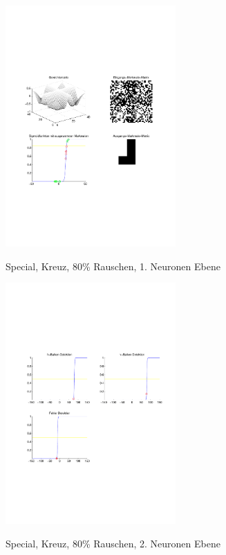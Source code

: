 \begin{figure}[hbt]
	\begin{minipage}[c]{\textwidth}
		\centering
       	\includegraphics[trim=71 213 43 212, clip, width=0.58\textwidth]{./Bilder/Auswertung/Endergebnis/TypeSpecial_Rauschen80_Cross_Layer1}
		\caption{Special, Kreuz, 80\% Rauschen, 1. Neuronen Ebene}
		\label{Special_Kreuz_80_1}
		\vfill
		\includegraphics[trim=71 213 43 212, clip, width=0.58\textwidth]{./Bilder/Auswertung/Endergebnis/TypeSpecial_Rauschen80_Cross_Layer2}
		\caption{Special, Kreuz, 80\% Rauschen, 2. Neuronen Ebene}
		\label{Special_Kreuz_80_2}
	\end{minipage}
\end{figure}
\clearpage

